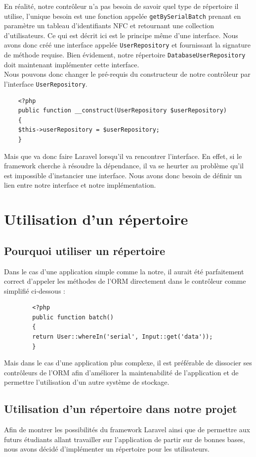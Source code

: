 	En réalité, notre contrôleur n'a pas besoin de savoir quel type de répertoire il utilise, l'unique besoin est une fonction appelée \verb|getBySerialBatch| prenant en paramètre un tableau d'identifiants NFC et retournant une collection d'utilisateurs. Ce qui est décrit ici est le principe même d'une interface. Nous avons donc créé une interface appelée \verb|UserRepository| et fournissant la signature de méthode requise. Bien évidement, notre répertoire \verb|DatabaseUserRepository| doit maintenant implémenter cette interface.\\

	Nous pouvons donc changer le pré-requis du constructeur de notre contrôleur par l'interface \verb|UserRepository|.
	\begin{verbatim}
	<?php
	public function __construct(UserRepository $userRepository)
	{
	$this->userRepository = $userRepository;
	}
	\end{verbatim}

	Mais que va donc faire Laravel lorsqu'il va rencontrer l'interface. En effet, si le framework cherche à résoudre la dépendance, il va se heurter au problème qu'il est impossible d'instancier une interface. Nous avons donc besoin de définir un lien entre notre interface et notre implémentation.

\section{Utilisation d'un répertoire}

	\subsection{Pourquoi utiliser un répertoire}
		Dans le cas d'une application simple comme la notre, il aurait été parfaitement correct d'appeler les méthodes de l'ORM directement dans le contrôleur comme simplifié ci-dessous :
		\begin{verbatim}
		<?php
		public function batch()
		{
		return User::whereIn('serial', Input::get('data'));
		}
		\end{verbatim}

		Mais dans le cas d'une application plus complexe, il est préférable de dissocier ses contrôleurs de l'ORM afin d'améliorer la maintenabilité de l'application et de permettre l'utilisation d'un autre système de stockage.

	\subsection{Utilisation d'un répertoire dans notre projet}
		Afin de montrer les possibilités du framework Laravel ainsi que de permettre aux futurs étudiants allant travailler sur l'application de partir sur de bonnes bases, nous avons décidé d'implémenter un répertoire pour les utilisateurs.\\

